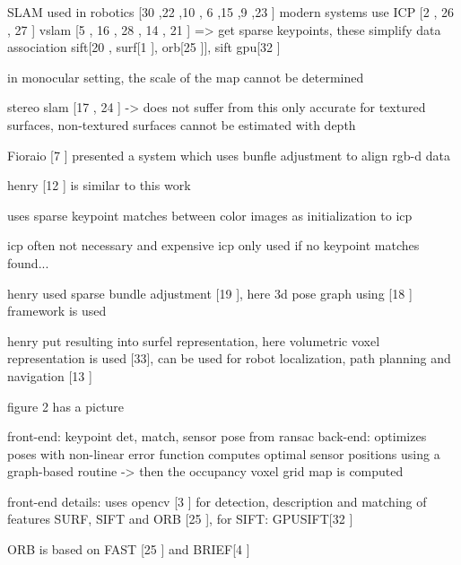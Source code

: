 SLAM used in robotics [30 \cite{Thrun02Robotic},22 \cite{Nuchter056d},10 \cite{Grisetti07Efficient}, 6 \cite{Dellaert06Square},15 \cite{Kaess08Isam},9 \cite{Frese05Multilevel},23 \cite{Olson06Fast}]
modern systems use ICP [2 \cite{Besl92Method}, 26 \cite{Rusinkiewicz01Efficient}, 27 \cite{Segal09Generalized}]
vslam [5 \cite{Davison03Real} , 16 \cite{Klein07Parallel}, 28 \cite{Strasdat10Real}, 14 \cite{Jin00Real}, 21 \cite{Nister05Preemptive}] => get sparse keypoints,  
these simplify data association
sift[20 \cite{Lowe04Distinctive}, surf[1 \cite{Bay06Surf,Bay08Speeded}], orb[25 \cite{Rublee11Orb}]], sift gpu[32 \cite{Wu07Siftgpu}]


in monocular setting, the scale of the map cannot be  determined

stereo slam [17 \cite{Konolige08Outdoor}, 24 \cite{Paz08Large}] -> does not suffer from this
only accurate for textured surfaces, non-textured surfaces cannot be estimated with depth

Fioraio [7 \cite{Fioraio11Realtime}] presented a system which uses bunfle adjustment to align rgb-d data

henry [12 \cite{Henry10Rgb,Henry14Rgb}] is similar to this work

uses sparse keypoint matches between color images as initialization to icp

icp often not necessary and expensive
icp only used if no keypoint matches found...

henry used sparse bundle adjustment [19 \cite{Lourakis09Sba} ], here 3d pose graph using [18 \cite{Kummerle11G}] framework is used

henry put resulting into surfel representation, here volumetric voxel representation is used [33], can be used for robot localization, path planning and navigation [13 \cite{Hornung10Humanoid}]

figure 2 has a picture

front-end: keypoint det, match, sensor pose from ransac
back-end: optimizes poses with non-linear error function
	computes optimal sensor positions using a graph-based routine -> then the occupancy voxel grid map is computed
	
front-end details: 
uses opencv [3 \cite{Bradski08Learning}] for detection, description and matching of features SURF, SIFT and ORB [25 \cite{Rublee11Orb} ], for SIFT: GPUSIFT[32 \cite{Wu07Siftgpu}]

ORB is based on FAST [25 \cite{Rosten06Machine}] and BRIEF[4 \cite{Calonder10Brief}]

